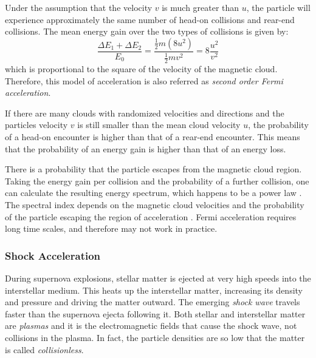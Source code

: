 Under the assumption that the velocity $v$ is much greater than $u$, the
particle will experience approximately the same number of head-on collisions and
rear-end collisions.  The mean energy gain over the two
types of collisions is given by:
\begin{equation}
\frac{\Delta E_1 + \Delta E_2}{E_0} = \frac{\frac{1}{2} m (8u^2)}{\frac{1}{2} m
v^2} = 8\frac{u^2}{v^2}
\end{equation}
which is proportional to the square of the velocity of the magnetic cloud.
Therefore, this model of acceleration is also referred as \emph{second order
Fermi acceleration}.

If there are many clouds with randomized velocities and directions and the
particles velocity $v$ is still smaller than the mean cloud velocity $u$, the
probability of a head-on encounter is higher than that of a rear-end
encounter. This means that the probability of an energy gain is higher than
that of an energy loss.

There is a probability that the particle escapes
from the magnetic cloud region.  Taking the energy gain per collision and the
probability of a further collision, one can calculate the resulting energy
spectrum, which happens to be a power law \cite[75]{Grupen:2005}.  The spectral
index depends on the magnetic cloud velocities and the probability of the
particle escaping the region of acceleration \cite{Grupen:2005}.  Fermi
acceleration requires long time scales, and therefore may not work in practice.


\subsubsection{Shock Acceleration}

During supernova explosions, stellar matter is ejected at very high speeds into
the interstellar medium.  This heats up the interstellar matter, increasing
its density and pressure and driving the matter outward.  The emerging
\emph{shock wave} travels faster than the supernova ejecta following it.
Both stellar and interstellar matter are \emph{plasmas} and it is the
electromagnetic fields that cause the shock wave, not collisions in the plasma.
In fact, the particle densities are so low that the matter is called
\emph{collisionless}.

